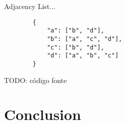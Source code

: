 \documentclass[a4paper]{article}
\begin{document}
    Adjacency List...

    \begin{verbatim}
        { 
            "a": ["b", "d"],
            "b": ["a", "c", "d"],
            "c": ["b", "d"],
            "d": ["a", "b", "c"]
        }
    \end{verbatim}


    TODO: código fonte

    \section*{Conclusion}

    
     
\end{document}
